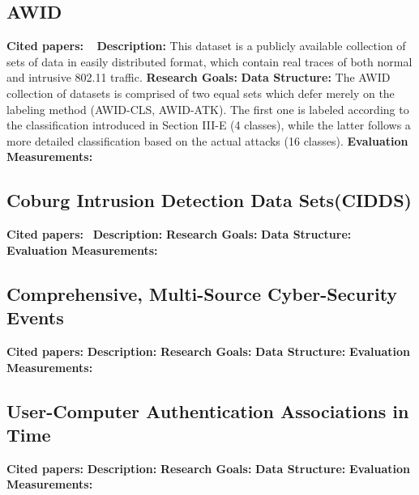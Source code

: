 \subsection{AWID}
\textbf{Cited papers:} ~\cite{kolias2016intrusion}\newline
\textbf{Description:} This dataset is a publicly available collection of sets of data in easily distributed format, which contain real traces of both normal and intrusive 802.11 traffic. \newline
\textbf{Research Goals:}  \newline
\textbf{Data Structure:} The AWID collection of datasets is comprised of two equal sets which defer merely on the labeling method (AWID-CLS, AWID-ATK). The first one is labeled according to the classification introduced in Section III-E (4 classes), while the latter follows a more detailed classification based on the actual attacks (16 classes). \newline
\textbf{Evaluation Measurements:} \newline

\subsection{Coburg Intrusion Detection Data Sets(CIDDS)}
\textbf{Cited papers:}~\cite{ring2017flow} \newline
\textbf{Description:} \newline
\textbf{Research Goals:}  \newline
\textbf{Data Structure:} \newline
\textbf{Evaluation Measurements:} \newline


\subsection{Comprehensive, Multi-Source Cyber-Security Events}
\textbf{Cited papers:} \newline
\textbf{Description:} \newline
\textbf{Research Goals:}  \newline
\textbf{Data Structure:} \newline
\textbf{Evaluation Measurements:} \newline

\subsection{User-Computer Authentication Associations in Time}
\textbf{Cited papers:} \newline
\textbf{Description:} \newline
\textbf{Research Goals:}  \newline
\textbf{Data Structure:} \newline
\textbf{Evaluation Measurements:} \newline

